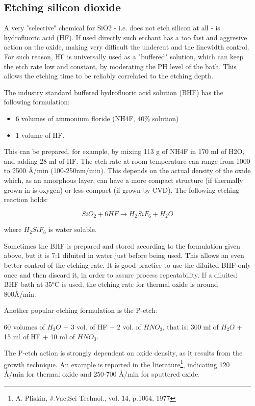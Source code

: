 \subsection{Etching silicon dioxide}
A very "selective" chemical for SiO2 - i.e. does not etch silicon at all - is hydrofluoric acid (HF). If used directly such etchant has a too fast and aggresive action on the oxide, making very difficult the undercut and the linewidth control. For such reason, HF is universally used as a "buffered" solution, which can keep the etch rate low and constant, by moderating the PH level of the bath. This allows the etching time to be reliably correlated to the etching depth.

The industry standard buffered hydrofluoric acid solution (BHF\label{BHF}) has the following formulation:
\begin{itemize}
	\item 6 volumes of ammonium floride (NH4F, 40\% solution)
	\item 1 volume of HF.
\end{itemize}

This can be prepared, for example, by mixing 113 g of NH4F in 170 ml of H2O, and adding 28 ml of HF. The etch rate at room temperature can range from 1000 to 2500 Å/min (100-250nm/min).
This depends on the actual density of the oxide which, as an amorphous layer, can have a more compact structure (if thermally grown in is oxygen) or less compact (if grown by CVD).
The following etching reaction holds:

\begin{equation}
	SiO_2 + 6HF \rightarrow H_2SiF_6 + H_2O
\end{equation}

where $H_2SiF_6$ is water soluble.

Sometimes the BHF is prepared and stored according to the formulation given above, but it is 7:1 diluited in water just before being used.
This allows an even better control of the etching rate.
It is good practice to use the diluited BHF only once and then discard it, in order to assure process repeatability.
If a diluited BHF bath at 35°C is used, the etching rate for thermal oxide is around 800Å/min.

Another popular etching formulation is the P-etch:

60 volumes of $H_2O$ + 3 vol. of HF + 2 vol. of $HNO_3$, that is: 300 ml of $H_2O$ + 15 ml of HF + 10 ml of $HNO_3$.

The P-etch action is strongly dependent on oxide density, as it results from the growth technique.
An example is reported in the literature\footnote{A. Pliskin, J.Vac.Sci Technol., vol. 14, p.1064, 1977}, indicating 120 Å/min for thermal oxide and 250-700 Å/min for sputtered oxide.

